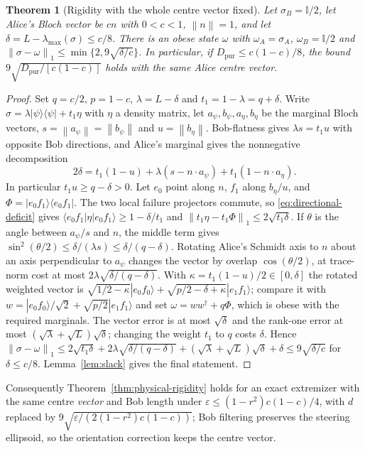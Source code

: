 \documentclass[11pt]{article}
\newtheorem{theorem}{Theorem}[section]
\theoremstyle{remark}\newtheorem{remark}[theorem]{Remark}
\newcommand{\id}{\mathbb I}\newcommand{\ket}[1]{|#1\rangle}
\newcommand{\bra}[1]{\langle#1|}\newcommand{\proj}[1]{\ket{#1}\bra{#1}}
\newcommand{\norm}[1]{\left\lVert#1\right\rVert}
\newcommand{\eps}{\varepsilon}
\newcommand{\Dp}{D_{\mathrm{pur}}}
\begin{document}
\begin{theorem}[Rigidity with the whole centre vector fixed]\label{thm:directional}
Let $\sigma_B=\id/2$, let Alice's Bloch vector be $cn$ with $0<c<1$,
$\norm n=1$, and let $\delta=L-\lambda_{\max}(\sigma)\le c/8$. There is an
obese state $\omega$ with $\omega_A=\sigma_A$, $\omega_B=\id/2$ and
$\norm{\sigma-\omega}_1\le\min\{2,9\sqrt{\delta/c}\}$. In particular, if
$\Dp\le c(1-c)/8$, the bound $9\sqrt{\Dp/[c(1-c)]}$ holds with the same Alice
centre vector.
\end{theorem}
\begin{proof}
Set $q=c/2$, $p=1-c$, $\lambda=L-\delta$ and $t_1=1-\lambda=q+\delta$. Write
$\sigma=\lambda\proj\psi+t_1\eta$ with $\eta$ a density matrix, let
$a_\psi,b_\psi,a_\eta,b_\eta$ be the marginal Bloch vectors, $s=\norm{a_\psi}=\norm{b_\psi}$
and $u=\norm{b_\eta}$. Bob-flatness gives $\lambda s=t_1u$ with opposite Bob
directions, and Alice's marginal gives the nonnegative decomposition
\begin{equation}\label{eq:directional-deficit}
 2\delta=t_1(1-u)+\lambda(s-n\cdot a_\psi)+t_1(1-n\cdot a_\eta).
\end{equation}
In particular $t_1u\ge q-\delta>0$. Let $e_0$ point along $n$, $f_1$ along
$b_\eta/u$, and $\Phi=\proj{e_0f_1}$. The two local failure projectors commute,
so \eqref{eq:directional-deficit} gives $\bra{e_0f_1}\eta\ket{e_0f_1}\ge1-\delta/t_1$
and $\norm{t_1\eta-t_1\Phi}_1\le2\sqrt{t_1\delta}$. If $\theta$ is the angle
between $a_\psi/s$ and $n$, the middle term gives
$\sin^2(\theta/2)\le\delta/(\lambda s)\le\delta/(q-\delta)$. Rotating Alice's
Schmidt axis to $n$ about an axis perpendicular to $a_\psi$ changes the vector
by overlap $\cos(\theta/2)$, at trace-norm cost at most
$2\lambda\sqrt{\delta/(q-\delta)}$. With $\kappa=t_1(1-u)/2\in[0,\delta]$ the
rotated weighted vector is
$\sqrt{1/2-\kappa}\ket{e_0f_0}+\sqrt{p/2-\delta+\kappa}\ket{e_1f_1}$; compare it
with $w=\ket{e_0f_0}/\sqrt2+\sqrt{p/2}\ket{e_1f_1}$ and set
$\omega=ww^\dagger+q\Phi$, which is obese with the required marginals. The
vector error is at most $\sqrt\delta$ and the rank-one error at most
$(\sqrt\lambda+\sqrt L)\sqrt\delta$; changing the weight $t_1$ to $q$ costs
$\delta$. Hence
$\norm{\sigma-\omega}_1\le2\sqrt{t_1\delta}+2\lambda\sqrt{\delta/(q-\delta)}
+(\sqrt\lambda+\sqrt L)\sqrt\delta+\delta\le9\sqrt{\delta/c}$ for
$\delta\le c/8$. Lemma~\ref{lem:slack} gives the final statement.
\end{proof}
Consequently Theorem~\ref{thm:physical-rigidity} holds for an exact extremizer
with the same centre \emph{vector} and Bob length under
$\eps\le(1-r^2)c(1-c)/4$, with $d$ replaced by
$9\sqrt{\eps/(2(1-r^2)c(1-c))}$; Bob filtering preserves the steering
ellipsoid, so the orientation correction keeps the centre vector.
\end{document}
